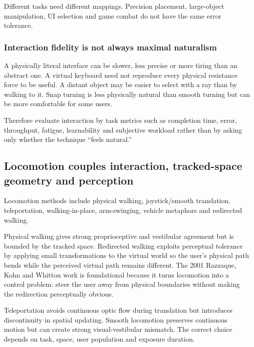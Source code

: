 Different tasks need different mappings. Precision placement, large-object manipulation, UI selection and game combat do not have the same error tolerance.

\subsubsection{Interaction fidelity is not always maximal naturalism}\label{interaction-fidelity-is-not-always-maximal-naturalism}

A physically literal interface can be slower, less precise or more tiring than an abstract one. A virtual keyboard need not reproduce every physical resistance force to be useful. A distant object may be easier to select with a ray than by walking to it. Snap turning is less physically natural than smooth turning but can be more comfortable for some users.

Therefore evaluate interaction by task metrics such as completion time, error, throughput, fatigue, learnability and subjective workload rather than by asking only whether the technique ``feels natural.''

\subsection{Locomotion couples interaction, tracked-space geometry and perception}\label{locomotion-couples-interaction-tracked-space-geometry-and-perception}

Locomotion methods include physical walking, joystick/smooth translation, teleportation, walking-in-place, arm-swinging, vehicle metaphors and redirected walking.

Physical walking gives strong proprioceptive and vestibular agreement but is bounded by the tracked space. Redirected walking exploits perceptual tolerance by applying small transformations to the virtual world so the user's physical path bends while the perceived virtual path remains different. The 2001 Razzaque, Kohn and Whitton work is foundational because it turns locomotion into a control problem: steer the user away from physical boundaries without making the redirection perceptually obvious.

Teleportation avoids continuous optic flow during translation but introduces discontinuity in spatial updating. Smooth locomotion preserves continuous motion but can create strong visual-vestibular mismatch. The correct choice depends on task, space, user population and exposure duration.

